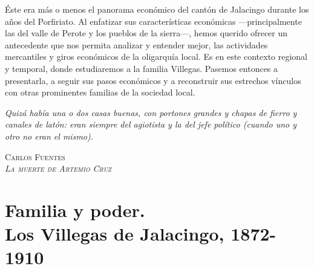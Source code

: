 \documentclass[14pt,twoside,final]{extbook} %
\begin{document}
Éste era más o menos el panorama económico del cantón de Jalacingo durante los años del Porfiriato. Al enfatizar sus características económicas ---principalmente las del valle de Perote y los pueblos de la sierra---, hemos querido ofrecer un antecedente que nos permita analizar y entender mejor, las actividades mercantiles y giros económicos de la oligarquía local. Es en este contexto regional y temporal, donde estudiaremos a la familia Villegas. Pasemos entonces a presentarla, a seguir sus pasos económicos y a reconstruir sus estrechos vínculos con otras prominentes familias de la sociedad local.
\cleardoublepage
\newpage
\pagestyle{empty}
\begin{flushright}
\footnotesize
\begin{minipage}{8cm}
\emph{Quizá había una o dos casas buenas, con portones grandes y chapas de fierro y canales de latón: eran siempre del agiotista y la del jefe político (cuando uno y otro no eran el mismo).}
\end{minipage}
\begin{flushright}
\textsc{Carlos Fuentes \\ \emph{La muerte de Artemio Cruz}}
\end{flushright}
\end{flushright}
\null\vfill
\chapter[Familia y poder. Los Villegas de Jalacingo, 1872-1910]{Familia y poder. \\ Los Villegas de Jalacingo, 1872-1910}\label{ch:capitulo-dos}
\thispagestyle{empty}
\pagestyle{fancy}
\fancyhf{} %
\fancyhead[RO,LE]{\iffloatpage{}{\thepage}}
\renewcommand\headrulewidth{\iffloatpage{0pt}{0pt}}
\setcounter{page}{59}
\end{document}
